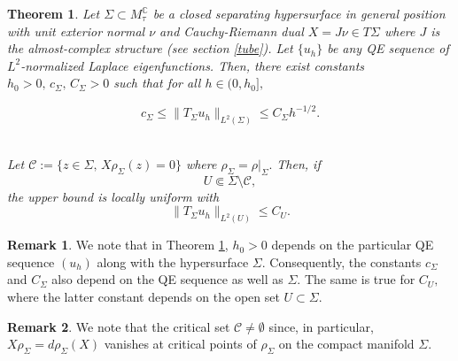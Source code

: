 \documentclass[11pt,reqno]{amsart}
\newcommand{\C}{{\mathbb C}}
\newtheorem{theorem}{Theorem}
\theoremstyle{definition}
\newtheorem{remark}{Remark}
\begin{document}
 


\begin{theorem} \label{bounds}
Let $\Sigma \subset M_{\tau}^{\C}$ be a closed separating hypersurface in general position with unit exterior normal $\nu$ and Cauchy-Riemann dual $X = J \nu \in T \Sigma$ where $J$ is the almost-complex structure  (see section \ref{tube}).  Let $\{ u_h \}$ be any QE sequence of $L^2$-normalized Laplace eigenfunctions. Then, there exist constants $ h_0>0, \, c_{\Sigma}, \,C_{\Sigma} >0$ such that for all $h \in (0,h_0],$

\begin{equation}\label{crude upper bound}
c_{\Sigma} \leq  \| T_{\Sigma} u_h \|_{L^2(\Sigma)} \leq C_{\Sigma} h^{-1/2}.
\end{equation}\

 Let  
 $ {\mathcal C}:=\{ z \in \Sigma, \, X \rho_{\Sigma}(z) =0 \}$ where $\rho_{\Sigma} = \rho |_{\Sigma}.$  Then, if
\begin{equation} \label{condition}
 U \Subset \Sigma \setminus {\mathcal C}, \end{equation} 
the upper bound is locally uniform with 
\begin{equation}\label{comparable}
\|T_{\Sigma}u_h\|_{L^2(U)}\leq C_{U}.
\end{equation}
\end{theorem} 




\begin{remark}
   We note that in Theorem \ref{bounds}, $h_0>0$ depends on the particular QE sequence $(u_h)$ along with the hypersurface $\Sigma.$  Consequently, the constants $c_{\Sigma}$ and $C_{\Sigma}$ also depend on the QE sequence as well as $\Sigma.$ The same is true for $C_{U},$ where the latter constant  depends on the open set $U \subset \Sigma.$ 
\end{remark}

\begin{remark}
We note that the critical set ${\mathcal C} \neq \emptyset$ since, in particular, $ X \rho_{\Sigma} = d\rho_{\Sigma} (X) $ vanishes at critical points of $\rho_{\Sigma}$ on the compact manifold $\Sigma.$

\end{remark}
\end{document}
